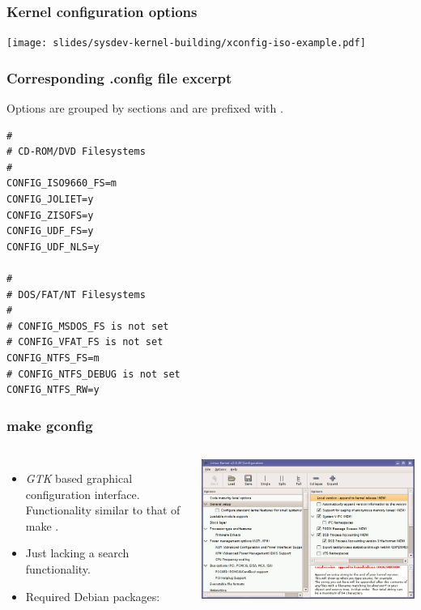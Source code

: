 \begin{frame}
\frametitle{Kernel configuration options}
  \begin{center}
    \texttt{[image: slides/sysdev-kernel-building/xconfig-iso-example.pdf]}
  \end{center}
\end{frame}

\begin{frame}[fragile]
  \frametitle{Corresponding .config file excerpt}
  Options are grouped by sections and are prefixed with
  .
\footnotesize
\begin{verbatim}
#
# CD-ROM/DVD Filesystems
#
CONFIG_ISO9660_FS=m
CONFIG_JOLIET=y
CONFIG_ZISOFS=y
CONFIG_UDF_FS=y
CONFIG_UDF_NLS=y

#
# DOS/FAT/NT Filesystems
#
# CONFIG_MSDOS_FS is not set
# CONFIG_VFAT_FS is not set
CONFIG_NTFS_FS=m
# CONFIG_NTFS_DEBUG is not set
CONFIG_NTFS_RW=y
\end{verbatim}
\end{frame}

\begin{frame}
  \frametitle{make gconfig}
  \begin{columns}
    \begin{itemize}
      \item {\em GTK} based graphical configuration interface. Functionality
            similar to that of make .
      \item Just lacking a search functionality.
      \item Required Debian packages: 
    \end{itemize}
    \includegraphics[width=\textwidth]{slides/sysdev-kernel-building/gconfig-screenshot.png}
  \end{columns}
\end{frame}

